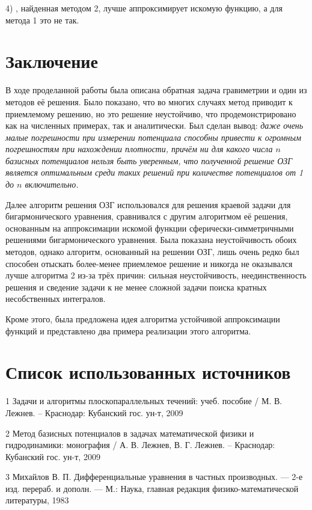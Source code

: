 \documentclass[a4paper]{article}
\begin{document}
  4) {, найденная методом 2, лучше аппроксимирует искомую функцию, а для метода 1 это не так}.

  \newpage
\section{Заключение}
В ходе проделанной работы была описана обратная задача гравиметрии и один из методов её решения. Было показано,
что во многих случаях метод приводит к приемлемому решению, но это решение неустойчиво, что продемонстрировано как на численных примерах,
так и аналитически. Был сделан вывод:
{\it даже очень малые погрешности при измерении потенциала способны привести к огромным погрешностям при нахождении плотности, причём ни для какого числа $n$ базисных потенциалов нельзя быть уверенным, что полученной решение ОЗГ является оптимальным среди таких решений при количестве потенциалов от 1 до $n$ включительно.}

Далее алгоритм решения ОЗГ использовался для решения краевой задачи для бигармонического уравнения, сравнивался с другим алгоритмом её решения,
основанным на аппроксимации искомой функции сферически-симметричными решениями бигармонического уравнения.
Была показана неустойчивость обоих методов, однако алгоритм, основанный на решении ОЗГ, лишь очень редко был способен отыскать более-менее приемлемое решение и никогда не оказывался лучше алгоритма 2 из-за трёх причин: сильная неустойчивость, неединственность решения и сведение задачи к не менее сложной задачи поиска кратных несобственных интегралов.

Кроме этого, была предложена идея алгоритма устойчивой аппроксимации функций и представлено два примера реализации этого алгоритма.

\newpage

\section*{Список использованных источников}
1 Задачи и алгоритмы плоскопараллельных течений: учеб. пособие / М. В. Лежнев. -- Краснодар: Кубанский гос. ун-т, 2009

2 Метод базисных потенциалов в задачах математической физики и гидродинамики: монография / А. В. Лежнев, В. Г. Лежнев. -- Краснодар: Кубанский гос. ун-т, 2009

3 Михайлов В. П. Дифференциальные уравнения в частных производных. --- 2-е изд. перераб. и дополн. --- М.: Наука, главная редакция физико-математической литературы, 1983
\end{document}
